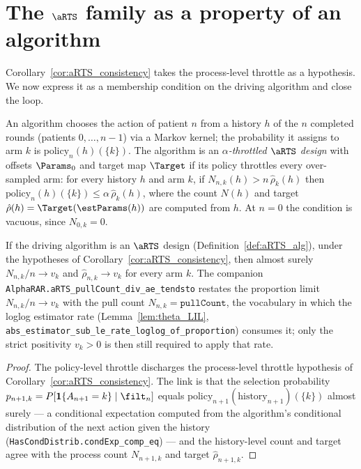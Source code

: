\section{The \texorpdfstring{$\aRTS$}{aRTS} family as a property of an algorithm}
\label{sec:aRTS_alg}

Corollary~\ref{cor:aRTS_consistency} takes the process-level throttle as a hypothesis. We now
express it as a membership condition on the driving algorithm and close the loop.

\begin{definition}\label{def:aRTS_alg}
\leanok
{}
An algorithm chooses the action of patient $n$ from a history $h$ of the $n$ completed rounds
(patients $0,\dots,n-1$) via a Markov kernel; the probability it assigns to arm $k$ is
$\mathrm{policy}_n(h)(\{k\})$. The algorithm
is an \emph{$\alpha$-throttled $\aRTS$ design} with offsets $\Params_0$ and target map $\Target$ if
its policy throttles every over-sampled arm: for every history $h$ and arm $k$, if
$N_{n,k}(h) > n\,\hat\rho_k(h)$ then $\mathrm{policy}_n(h)(\{k\}) \le \alpha\,\hat\rho_k(h)$,
where the count $N(h)$ and target $\hat\rho(h)=\Target(\estParams(h))$ are computed from $h$.
At $n=0$ the condition is vacuous, since $N_{0,k}=0$.
\end{definition}

\begin{corollary}\label{cor:aRTS_alg_consistency}
\leanok
{}
If the driving algorithm is an $\aRTS$ design (Definition~\ref{def:aRTS_alg}), under the hypotheses
of Corollary~\ref{cor:aRTS_consistency}, then almost surely $N_{n,k}/n\to v_k$ and
$\hat\rho_{n,k}\to v_k$ for every arm $k$. The companion
\texttt{AlphaRAR.aRTS\_pullCount\_div\_ae\_tendsto} restates the proportion limit
$N_{n,k}/n\to v_k$ with the pull count $N_{n,k}=\texttt{pullCount}$, the vocabulary in which the
loglog estimator rate (Lemma~\ref{lem:theta_LIL},
\texttt{abs\_estimator\_sub\_le\_rate\_loglog\_of\_proportion}) consumes it; only the strict
positivity $v_k>0$ is then still required to apply that rate.
\end{corollary}

\begin{proof}\leanok
{}
The policy-level throttle discharges the process-level throttle hypothesis of
Corollary~\ref{cor:aRTS_consistency}. The link is that the selection probability
$p_{n+1,k}=P[\mathbf 1\{A_{n+1}=k\}\mid\filt_n]$ equals
$\mathrm{policy}_{n+1}(\text{history}_{n+1})(\{k\})$ almost surely — a conditional expectation computed from the algorithm's conditional distribution of
the next action given the history (\texttt{HasCondDistrib.condExp\_comp\_eq}) — and the history-level
count and target agree with the process count $N_{n+1,k}$ and target $\hat\rho_{n+1,k}$.
\end{proof}


